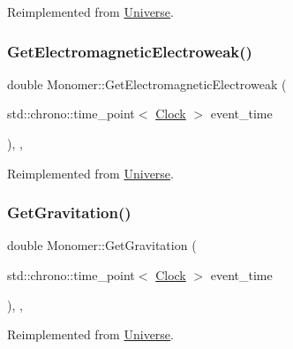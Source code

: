 Reimplemented from \mbox{\hyperlink{classUniverse_a63b850ef3f3394313353109d222bf5d1}{Universe}}.

\mbox{\label{classMonomer_a9b270cd1293bc9635813ead284bd3881}} 
\subsubsection{\texorpdfstring{Get\+Electromagnetic\+Electroweak()}{GetElectromagneticElectroweak()}}
{\footnotesize\ttfamily double Monomer\+::\+Get\+Electromagnetic\+Electroweak (\begin{DoxyParamCaption}\item[{std\+::chrono\+::time\+\_\+point$<$ \mbox{\hyperlink{universe_8h_a0ef8d951d1ca5ab3cfaf7ab4c7a6fd80}{Clock}} $>$}]{event\+\_\+time }\end{DoxyParamCaption})\hspace{0.3cm}{\ttfamily [inline]}, {\ttfamily [final]}, {\ttfamily [virtual]}}



Reimplemented from \mbox{\hyperlink{classUniverse_a9f099605c082e7fa755787a6a8cab7ba}{Universe}}.

\mbox{\label{classMonomer_aa5f7b901e15c9a9eb6e1c3564cd06e4f}} 
\subsubsection{\texorpdfstring{Get\+Gravitation()}{GetGravitation()}}
{\footnotesize\ttfamily double Monomer\+::\+Get\+Gravitation (\begin{DoxyParamCaption}\item[{std\+::chrono\+::time\+\_\+point$<$ \mbox{\hyperlink{universe_8h_a0ef8d951d1ca5ab3cfaf7ab4c7a6fd80}{Clock}} $>$}]{event\+\_\+time }\end{DoxyParamCaption})\hspace{0.3cm}{\ttfamily [inline]}, {\ttfamily [final]}, {\ttfamily [virtual]}}



Reimplemented from \mbox{\hyperlink{classUniverse_ab0404e774ee0ed66b597ff5b8e989446}{Universe}}.

